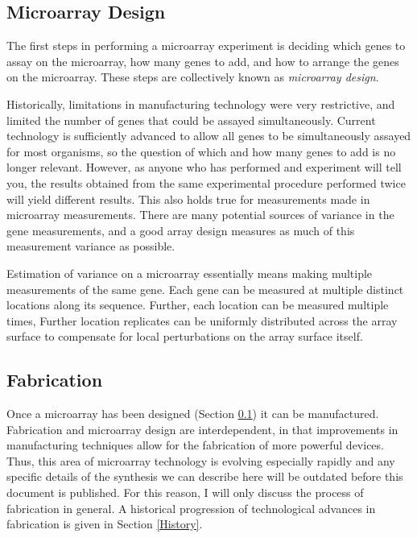 \subsection{Microarray Design}
\label{ArrayDesign}

The first steps in performing a microarray experiment is deciding which genes
to assay on the microarray, how many genes to add, and how to arrange the genes
on the microarray.  These steps are collectively known as \emph{microarray
design}.

Historically, limitations in manufacturing technology were very restrictive,
and limited the number of genes that could be assayed simultaneously.  Current
technology is sufficiently advanced to allow all genes to be simultaneously
assayed for most organisms, so the question of which and how many genes to add
is no longer relevant.  However, as anyone who has performed and experiment
will tell you, the results obtained from the same experimental procedure
performed twice will yield different results.  This also holds true for
measurements made in microarray measurements.  There are many potential sources
of variance in the gene measurements, and a good array design measures as much
of this measurement variance as possible.

Estimation of variance on a microarray essentially means making multiple
measurements of the same gene.  Each gene can be measured at multiple distinct
locations along its sequence.  Further, each location can be measured multiple
times, Further location replicates can be uniformly distributed across the
array surface to compensate for local perturbations on the array surface
itself.

\subsection{Fabrication}
\label{Fabrication}

Once a microarray has been designed (Section \ref{ArrayDesign}) it can be
manufactured.  Fabrication and microarray design are interdependent, in that
improvements in manufacturing techniques allow for the fabrication of more
powerful devices.  Thus, this area of microarray technology is evolving
especially rapidly and any specific details of the synthesis we can describe
here will be outdated before this document is published.  For this reason, I
will only discuss the process of fabrication in general.  A historical
progression of technological advances in fabrication is given in Section
\ref{History}.

